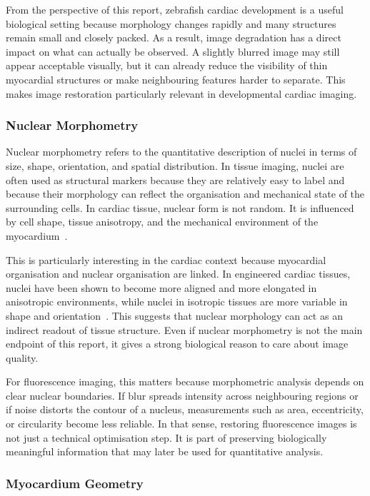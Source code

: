 From the perspective of this report, zebrafish cardiac development is a useful biological setting because morphology changes rapidly and many structures remain small and closely packed. As a result, image degradation has a direct impact on what can actually be observed. A slightly blurred image may still appear acceptable visually, but it can already reduce the visibility of thin myocardial structures or make neighbouring features harder to separate. This makes image restoration particularly relevant in developmental cardiac imaging.

\subsubsection{Nuclear Morphometry}

Nuclear morphometry refers to the quantitative description of nuclei in terms of size, shape, orientation, and spatial distribution. In tissue imaging, nuclei are often used as structural markers because they are relatively easy to label and because their morphology can reflect the organisation and mechanical state of the surrounding cells. In cardiac tissue, nuclear form is not random. It is influenced by cell shape, tissue anisotropy, and the mechanical environment of the myocardium~\cite{...}.

This is particularly interesting in the cardiac context because myocardial organisation and nuclear organisation are linked. In engineered cardiac tissues, nuclei have been shown to become more aligned and more elongated in anisotropic environments, while nuclei in isotropic tissues are more variable in shape and orientation~\cite{...}. This suggests that nuclear morphology can act as an indirect readout of tissue structure. Even if nuclear morphometry is not the main endpoint of this report, it gives a strong biological reason to care about image quality.

For fluorescence imaging, this matters because morphometric analysis depends on clear nuclear boundaries. If blur spreads intensity across neighbouring regions or if noise distorts the contour of a nucleus, measurements such as area, eccentricity, or circularity become less reliable. In that sense, restoring fluorescence images is not just a technical optimisation step. It is part of preserving biologically meaningful information that may later be used for quantitative analysis.

\subsubsection{Myocardium Geometry}


